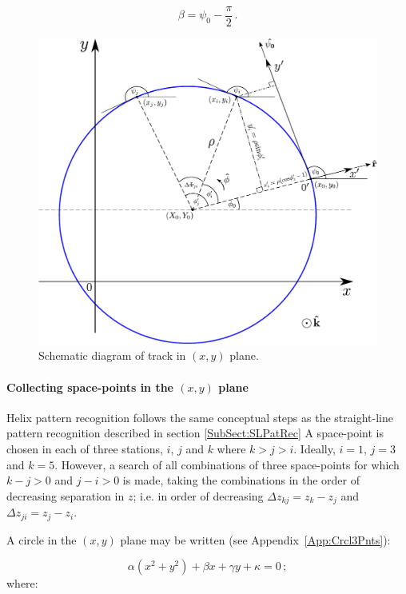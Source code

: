 \begin{equation}
  \beta = \psi_0 - \frac{\pi}{2} \, .
\end{equation}
\begin{figure}
  \begin{center}
    \includegraphics[width=0.85\linewidth]{detectors/tracker/04-Reconstruction/04-03-Pattern-recognition/Figures/Track-model.pdf}
  \end{center}
  \caption{Schematic diagram of track in $(x, y)$ plane.}
  \label{Fig:PatRecTrkMdl}
\end{figure}

\paragraph{Collecting space-points in the $(x, y)$ plane}

Helix pattern recognition follows the same conceptual steps as the straight-line pattern recognition described in section \ref{SubSect:SLPatRec} A space-point is chosen in each of three stations, $i$, $j$ and $k$ where $k>j>i$. Ideally, $i=1$, $j=3$ and $k=5$. However, a search of all combinations of three space-points for which $k-j>0$ and $j-i>0$ is made, taking the combinations in the order of decreasing separation in $z$; i.e. in order of decreasing $\Delta z_{kj} = z_k - z_j$ and $\Delta z_{ji} = z_j - z_i$. 

A circle in the $(x, y)$ plane may be written (see Appendix~\ref{App:Crcl3Pnts}):

\begin{equation}
  \alpha(x^2+y^2) + \beta x + \gamma y + \kappa = 0 \, ;
  \label{Eq:HPRCrclPrm}
\end{equation}
where:


